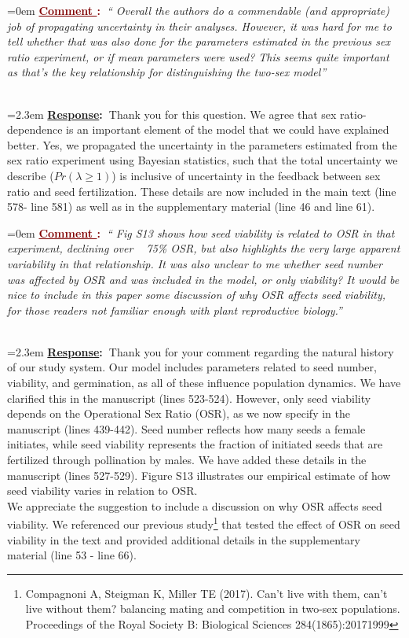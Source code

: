 \documentclass[12pt]{article}
\newcounter{cN}
\newcommand{\comment}[1]{
	\vspace{2em}
	\refstepcounter{cN} %
	\noindent \hangindent=0em \textbf{\textcolor{Maroon}{\uline{Comment \thecN}:~}}\emph{``#1''}
	}
\newcommand{\response}[1]{
	\\[0.25em]
	\hangindent=2.3em \textbf{\textcolor{NavyBlue}{\uline{Response}:~}}#1
	}
\begin{document}
\comment{ Overall the authors do a commendable (and appropriate) job of propagating uncertainty in their analyses. However, it was hard for me to tell whether that was also done for the parameters estimated in the previous sex ratio experiment, or if mean parameters were used? This seems quite important as that’s the key
relationship for distinguishing the two-sex model}
\response{Thank you for this question. We agree that sex ratio-dependence is an important element of the model that we could have explained better. Yes, we propagated the uncertainty in the parameters estimated from the sex ratio experiment using Bayesian statistics, such that the total uncertainty we describe ($Pr(\lambda \ge 1)$) is inclusive of uncertainty in the feedback between sex ratio and seed fertilization. 
These details are now included in the main text (line 578- line 581) as well as in the supplementary material (line 46 and line 61).}

\comment{ Fig S13 shows how seed viability is related to OSR in that experiment, declining over ~ 75\% OSR, but also highlights
the very large apparent variability in that relationship. It was also unclear to me whether seed number was affected by OSR and was included in the model, or only
viability? It would be nice to include in this paper some discussion of why OSR affects seed viability, for those readers not familiar enough with plant reproductive
biology.}
\response{Thank you for your comment regarding the natural history of our study system. 
Our model includes parameters related to seed number, viability, and germination, as all of these influence population dynamics. 
We have clarified this in the manuscript (lines 523-524).
However, only seed viability depends on the Operational Sex Ratio (OSR), as we now specify in the manuscript (lines 439-442). 
Seed number reflects how many seeds a female initiates, while seed viability represents the fraction of initiated seeds that are fertilized through pollination by males.
We have added these details in the manuscript (lines 527-529).
Figure S13 illustrates our empirical estimate of how seed viability varies in relation to OSR. 
\\
We appreciate the suggestion to include a discussion on why OSR affects seed viability. We referenced our previous study\footnote{Compagnoni A, Steigman K, Miller TE (2017). Can’t live with them, can’t live without them? balancing mating and competition in two-sex populations. Proceedings of the Royal Society B: Biological Sciences 284(1865):20171999} that tested the effect of OSR on seed viability in the text and provided additional details in the supplementary material (line 53 - line 66). }
\end{document}
